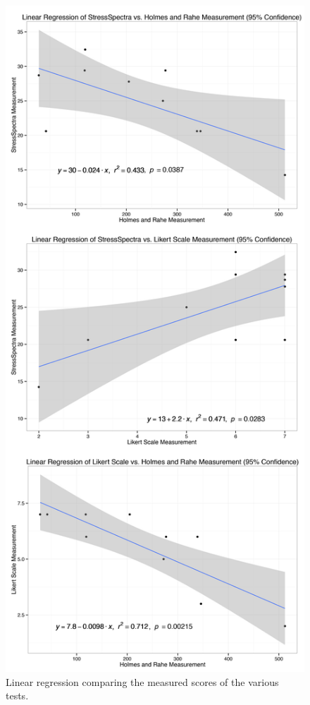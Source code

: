 \documentclass{sigchi}
\begin{document}
\begin{figure}[!h]
\centering
\includegraphics[width=0.9\columnwidth]{evalRegression}
\caption{Linear regression comparing the measured scores of the various tests.}
\label{fig:evalreg}
\end{figure}
\end{document}
